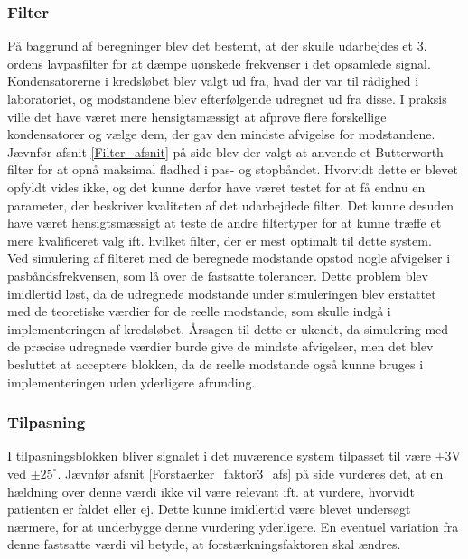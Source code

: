 \subsubsection{Filter}
På baggrund af beregninger blev det bestemt, at der skulle udarbejdes et 3. ordens lavpasfilter for at dæmpe uønskede frekvenser i det opsamlede signal. Kondensatorerne i kredsløbet blev valgt ud fra, hvad der var til rådighed i laboratoriet, og modstandene blev efterfølgende udregnet ud fra disse. I praksis ville det have været mere hensigtsmæssigt at afprøve flere forskellige kondensatorer og vælge dem, der gav den mindste afvigelse for modstandene.
Jævnfør afsnit \ref{Filter_afsnit} på side \pageref{Filter_afsnit} blev der valgt at anvende et Butterworth filter for at opnå maksimal fladhed i pas- og stopbåndet. Hvorvidt dette er blevet opfyldt vides ikke, og det kunne derfor have været testet for at få endnu en parameter, der beskriver kvaliteten af det udarbejdede filter. Det kunne desuden have været hensigtsmæssigt at teste de andre filtertyper for at kunne træffe et mere kvalificeret valg ift. hvilket filter, der er mest optimalt til dette system. \\  
Ved simulering af filteret med de beregnede modstande opstod nogle afvigelser i pasbåndsfrekvensen, som lå over de fastsatte tolerancer. Dette problem blev imidlertid løst, da de udregnede modstande under simuleringen blev erstattet med de teoretiske værdier for de reelle modstande, som skulle indgå i implementeringen af kredsløbet. Årsagen til dette er ukendt, da simulering med de præcise udregnede værdier burde give de mindste afvigelser, men det blev besluttet at acceptere blokken, da de reelle modstande også kunne bruges i implementeringen uden yderligere afrunding.

\subsubsection{Tilpasning}
I tilpasningsblokken bliver signalet i det nuværende system tilpasset til være $\pm3$V ved $\pm25^{\circ}$. Jævnfør afsnit \ref{Forstaerker_faktor3_afs} på side \pageref{Forstaerker_faktor3_afs} vurderes det, at en hældning over denne værdi ikke vil være relevant ift. at vurdere, hvorvidt patienten er faldet eller ej. Dette kunne imidlertid være blevet undersøgt nærmere, for at underbygge denne vurdering yderligere. En eventuel variation fra denne fastsatte værdi vil betyde, at forstærkningsfaktoren skal ændres.  

